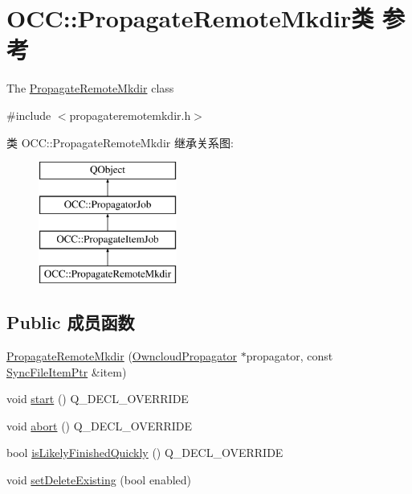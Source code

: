 \hypertarget{class_o_c_c_1_1_propagate_remote_mkdir}{}\section{O\+CC\+:\+:Propagate\+Remote\+Mkdir类 参考}
\label{class_o_c_c_1_1_propagate_remote_mkdir}


The \hyperlink{class_o_c_c_1_1_propagate_remote_mkdir}{Propagate\+Remote\+Mkdir} class  




{\ttfamily \#include $<$propagateremotemkdir.\+h$>$}

类 O\+CC\+:\+:Propagate\+Remote\+Mkdir 继承关系图\+:\begin{figure}[H]
\begin{center}
\leavevmode
\includegraphics[height=4.000000cm]{class_o_c_c_1_1_propagate_remote_mkdir}
\end{center}
\end{figure}
\subsection*{Public 成员函数}
\begin{DoxyCompactItemize}
\item 
\hyperlink{class_o_c_c_1_1_propagate_remote_mkdir_a2eb75587507679e35f1b0b09bd3540e2}{Propagate\+Remote\+Mkdir} (\hyperlink{class_o_c_c_1_1_owncloud_propagator}{Owncloud\+Propagator} $\ast$propagator, const \hyperlink{namespace_o_c_c_acb6b0db82893659fbd0c98d3c5b8e2b8}{Sync\+File\+Item\+Ptr} \&item)
\item 
void \hyperlink{class_o_c_c_1_1_propagate_remote_mkdir_a9bc9722b6554147bdb84d65effe15dee}{start} () Q\+\_\+\+D\+E\+C\+L\+\_\+\+O\+V\+E\+R\+R\+I\+DE
\item 
void \hyperlink{class_o_c_c_1_1_propagate_remote_mkdir_a9a591f296168a544c7732212647d7ba4}{abort} () Q\+\_\+\+D\+E\+C\+L\+\_\+\+O\+V\+E\+R\+R\+I\+DE
\item 
bool \hyperlink{class_o_c_c_1_1_propagate_remote_mkdir_a440d6d170f440c0e681198d1bfd4efda}{is\+Likely\+Finished\+Quickly} () Q\+\_\+\+D\+E\+C\+L\+\_\+\+O\+V\+E\+R\+R\+I\+DE
\item 
void \hyperlink{class_o_c_c_1_1_propagate_remote_mkdir_a625d3807bca26958611f898f5637ee0f}{set\+Delete\+Existing} (bool enabled)
\end{DoxyCompactItemize}
